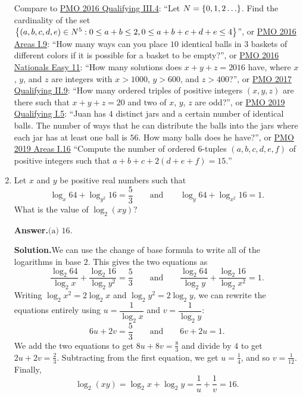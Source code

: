 \documentclass[11pt,paper=letter]{scrartcl}
\newcommand{\ans}{{\sffamily \bfseries Answer.}\;}
\newcommand{\sol}{{\sffamily \bfseries Solution.}\;}
\newcommand{\rem}[1]{{\small \sffamily \sansmath {\bfseries Remark.} #1}}
\begin{document}
\begin{enumerate}[align=left,leftmargin=*]
\rem{Compare to \href{http://pmo.ph/wp-content/uploads/2015/10/18thPMO-QualifyingRound-Questions.pdf}{PMO 2016 Qualifying III.4}: ``Let ${N = \left\{ 0, 1, 2 \ldots \right\}}$. Find the cardinality of the set ${\left\{ (a, b, c, d, e) \in N^5 : 0 \leq a + b \leq 2, 0 \leq a + b + c + d + e \leq 4 \right\}}$'', or \href{http://pmo.ph/wp-content/uploads/2014/08/18th-PMO-Area-Stage.pdf}{PMO 2016 Areas I.9}: ``How many ways can you place ${10}$ identical balls in 3 baskets of different colors if it is possible for a basket to be empty?'', or \href{http://pmo.ph/wp-content/uploads/2014/08/18th-PMO-National-Stage-Oral-Phase-Q-and-A.pdf}{PMO 2016 Nationals Easy 11}: ``How many solutions does ${x + y + z = 2016}$ have, where ${x}$, ${y}$, and ${z}$ are integers with ${x > 1000}$, ${y > 600}$, and ${z > 400}$?'', or \href{http://pmo.ph/wp-content/uploads/2014/08/19th-PMO-Qualifying-Stage-Questions-and-Answers.pdf}{PMO 2017 Qualifying II.9}: ``How many ordered triples of positive integers ${(x, y, z)}$ are there such that ${x + y + z = 20}$ and two of ${x}$, ${y}$, ${z}$ are odd?'', or \href{http://cjquines.com/files/pmo2019quals.pdf}{PMO 2019 Qualifying I.5}: ``Juan has ${4}$ distinct jars and a certain number of identical balls. The number of ways that he can distribute the balls into the jars where each jar has at least one ball is ${56}$. How many balls does he have?'', or \href{https://cjquines.com/files/pmo2019areas.pdf}{PMO 2019 Areas I.16{}} ``Compute the number of ordered $6$-tuples $(a,b,c,d,e,f)$ of positive integers such that $a + b + c + 2(d+e+f) = 15.$''}

\item Let $x$ and $y$ be positive real numbers such that
\[
  \log_x 64 + \log_{y^2} 16 = \dfrac{5}{3}\qquad \text{and}\qquad \log_y 64 + \log_{x^2} 16 = 1.
\]
What is the value of $\log_2(xy)$?


\ans $\boxed{\text{(a) }16}$.

\sol We can use the change of base formula to write all of the logarithms in base $2$. This gives the two equations as
\[
  \frac{\log_2 64}{\log_2 x} + \frac{\log_2 16}{\log_2 y^2} = \frac{5}{3} \qquad \text{and} \qquad \frac{\log_2 64}{\log_2 y} + \frac{\log_2 16}{\log_2 x^2} = 1.
\]
Writing $\log_2 x^2 = 2\log_2 x$ and $\log_2 y^2 = 2 \log_2 y$, we can rewrite the equations entirely using $u = \dfrac{1}{\log_2 x}$ and $v = \dfrac{1}{\log_2 y}$:
\[
  6u + 2v = \frac{5}{3} \qquad \text{and} \qquad 6v + 2u = 1.
\]
We add the two equations to get $8u + 8v = \frac{8}{3}$ and divide by $4$ to get $2u + 2v = \frac{2}{3}$. Subtracting from the first equation, we get $u = \frac{1}{4}$, and so $v = \frac{1}{12}$. Finally,
$$\log_2(xy) = \log_2 x + \log_2 y = \frac{1}{u} + \frac{1}{v} = 16.$$


\end{enumerate}
\end{document}
